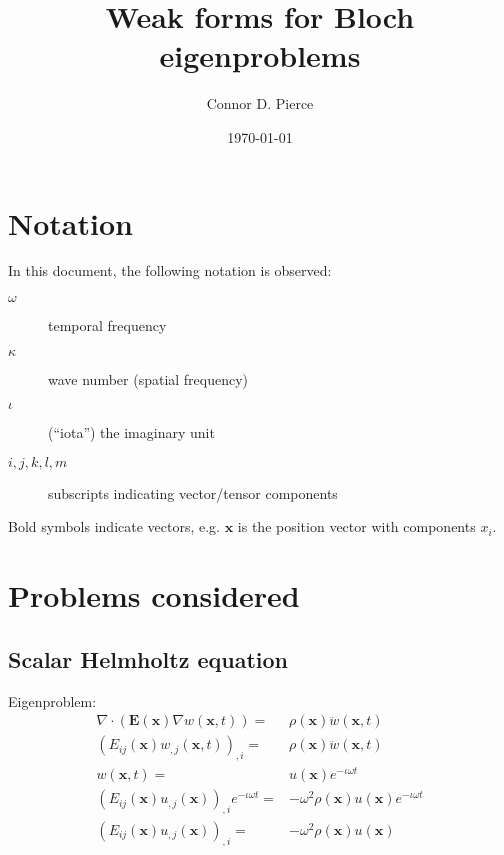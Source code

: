 \documentclass{article}
\title{Weak forms for Bloch eigenproblems}
\author{Connor D. Pierce}
\date{\today}
\newcommand{\imag}{\iota}
\newcommand{\vect}[1]{\boldsymbol{#1}}
\newcommand{\x}{x}
\newcommand{\vecx}{\vect{\x}}
\newcommand{\wavenum}{\kappa}
\begin{document}
\maketitle
\tableofcontents


\section{Notation}

In this document, the following notation is observed:
%
\begin{description}
    \item[$\omega$] temporal frequency
    \item[$\wavenum$] wave number (spatial frequency)
    \item[$\imag$] (``iota'') the imaginary unit
    \item[$i,j,k,l,m$] subscripts indicating vector/tensor components
\end{description}
%
Bold symbols indicate vectors, e.g. \(\vecx\) is the position vector with components \(\x_{i}\).


\section{Problems considered} \label{sec:prob}


\subsection{Scalar Helmholtz equation} \label{sec:prob.scalar}

Eigenproblem:
%
\begin{align}
    \nabla \cdot \left(
    \boldsymbol{E}(\vecx) \nabla w(\vecx, t)
    \right) =& \rho(\vecx) \ddot{w}(\vecx, t) \nonumber \\
    \left(
    E_{ij}(\vecx) w_{,j}(\vecx, t)
    \right)_{,i} =& \rho(\vecx) \ddot{w}(\vecx, t) \nonumber \\
    w(\vecx, t) =& u(\vecx) e^{-\imag \omega t} \nonumber \\
    \left(
        E_{ij}(\vecx) u_{,j}(\vecx)
    \right)_{,i} e^{-\imag \omega t} =& -\omega^2 \rho(\vecx) u(\vecx) e^{
        -\imag \omega t
    } \nonumber \\
    \left(
        E_{ij}(\vecx) u_{,j}(\vecx)
    \right)_{,i} =& -\omega^2 \rho(\vecx) u(\vecx) \label{eq:prob.scalar}
\end{align}
\end{document}
